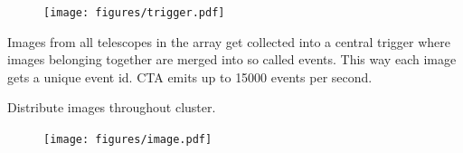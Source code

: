 \begin{multicols}{2}
    \columnbreak

        \begin{center}

        \begin{streamblock}[equal height group=C, width=0.8\linewidth]{0mm}{-5mm}{}%
          \begin{multicols}{2}
            \begin{figure}
              \texttt{[image: figures/trigger.pdf]}
            \end{figure}
            \columnbreak
            Images from all telescopes in the array get collected into a central trigger where images belonging together are merged into so called events.
            This way each image gets a unique event id.
            CTA emits up to \num{15 000} events per second\cite{trigger}.
          \end{multicols}
        \end{streamblock}%

        \begin{streamblock}[colframe=white!60!black, height=2.1cm, width=0.8\linewidth]{-5mm}{0mm}{}%
          \begin{center}
            Distribute images throughout cluster.
          \end{center}
        \end{streamblock}%

        \begin{streamblock}[equal height group=C, width=0.8\linewidth]{0mm}{-5mm}{}%
          \begin{multicols}{2}
            \begin{figure}
              \texttt{[image: figures/image.pdf]}
            \end{figure}


\end{multicols}
\end{streamblock}
\end{center}
\end{multicols}
